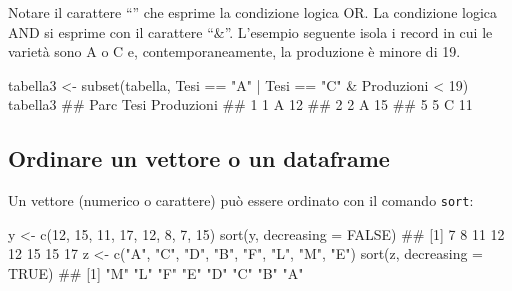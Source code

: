 \documentclass[a4paper,12pt,oneside]{book}
\newenvironment{Shaded}{}{}
\newcommand{\KeywordTok}[1]{#1}
\newcommand{\DataTypeTok}[1]{#1}
\newcommand{\DecValTok}[1]{#1}
\newcommand{\StringTok}[1]{#1}
\newcommand{\CommentTok}[1]{#1}
\newcommand{\OtherTok}[1]{#1}
\newcommand{\OperatorTok}[1]{#1}
\newcommand{\NormalTok}[1]{#1}
\begin{document}
Notare il carattere ``\textbar{}'' che esprime la condizione logica OR. La condizione logica AND si esprime con il carattere ``\&''. L'esempio seguente isola i record in cui le varietà sono A o C e, contemporaneamente, la produzione è minore di 19.

\begin{Shaded}
\begin{Highlighting}[]
\NormalTok{tabella3  <-}\StringTok{  }\KeywordTok{subset}\NormalTok{(tabella, Tesi }\OperatorTok{==}\StringTok{ "A"} \OperatorTok{|}\StringTok{ }\NormalTok{Tesi }\OperatorTok{==}\StringTok{ "C"} \OperatorTok{&}\StringTok{ }
\StringTok{                       }\NormalTok{Produzioni }\OperatorTok{<}\StringTok{ }\DecValTok{19}\NormalTok{)}
\NormalTok{tabella3}
\CommentTok{##   Parc Tesi Produzioni}
\CommentTok{## 1    1    A         12}
\CommentTok{## 2    2    A         15}
\CommentTok{## 5    5    C         11}
\end{Highlighting}
\end{Shaded}

\hypertarget{ordinare-un-vettore-o-un-dataframe}{%
\subsection*{Ordinare un vettore o un dataframe}\label{ordinare-un-vettore-o-un-dataframe}}

Un vettore (numerico o carattere) può essere ordinato con il comando \texttt{sort}:

\begin{Shaded}
\begin{Highlighting}[]
\NormalTok{y  <-}\StringTok{  }\KeywordTok{c}\NormalTok{(}\DecValTok{12}\NormalTok{, }\DecValTok{15}\NormalTok{, }\DecValTok{11}\NormalTok{, }\DecValTok{17}\NormalTok{, }\DecValTok{12}\NormalTok{, }\DecValTok{8}\NormalTok{, }\DecValTok{7}\NormalTok{, }\DecValTok{15}\NormalTok{)}
\KeywordTok{sort}\NormalTok{(y, }\DataTypeTok{decreasing =} \OtherTok{FALSE}\NormalTok{)}
\CommentTok{## [1]  7  8 11 12 12 15 15 17}
\NormalTok{z  <-}\StringTok{  }\KeywordTok{c}\NormalTok{(}\StringTok{"A"}\NormalTok{, }\StringTok{"C"}\NormalTok{, }\StringTok{"D"}\NormalTok{, }\StringTok{"B"}\NormalTok{, }\StringTok{"F"}\NormalTok{, }\StringTok{"L"}\NormalTok{, }\StringTok{"M"}\NormalTok{, }\StringTok{"E"}\NormalTok{)}
\KeywordTok{sort}\NormalTok{(z, }\DataTypeTok{decreasing =} \OtherTok{TRUE}\NormalTok{)}
\CommentTok{## [1] "M" "L" "F" "E" "D" "C" "B" "A"}
\end{Highlighting}
\end{Shaded}
\end{document}
